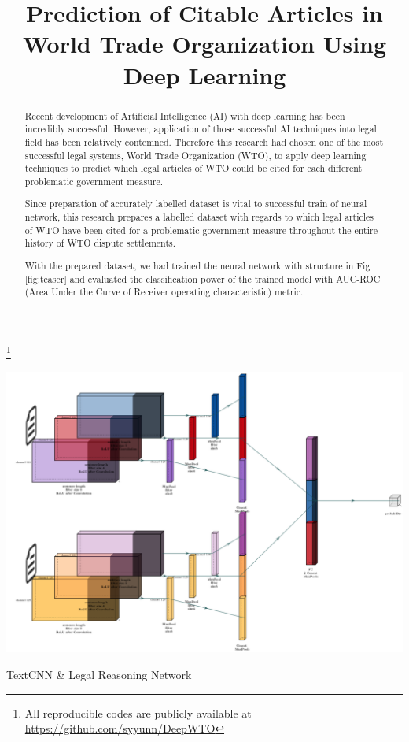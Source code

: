 \documentclass[sigconf]{acmart}
\begin{document}
\title{Prediction of Citable Articles in World Trade Organization Using Deep Learning} 

\author{}
\thanks{All reproducible codes are publicly available at \hyperlink{https://github.com/syyunn/DeepWTO}{https://github.com/syyunn/DeepWTO}}
\affiliation{
    \institution{}
    \position{}
    \email{}
    }

\begin{abstract}

 Recent development of Artificial Intelligence (AI) with deep learning has been incredibly successful. However, application of those successful AI techniques into legal field has been relatively contemned. Therefore this research had chosen one of the most successful legal systems, World Trade Organization (WTO), to apply deep learning techniques to predict which legal articles of WTO could be cited for each different problematic government measure. 
 
 Since preparation of accurately labelled dataset is vital to successful train of neural network, this research prepares a labelled dataset with regards to which legal articles of WTO have been cited for a problematic government measure throughout the entire history of WTO dispute settlements. 
 
 With the prepared dataset, we had trained the neural network with structure in Fig \ref{fig:teaser} and evaluated the classification power of the trained model with AUC-ROC (Area Under the Curve of Receiver operating characteristic) metric.
 \end{abstract}



\begin{teaserfigure}
  \includegraphics[width=\textwidth]{network.png}
  \caption{TextCNN \& Legal Reasoning Network}
  \label{fig:teaser}
\end{teaserfigure}
\end{document}
